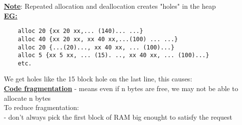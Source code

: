 \documentclass[12pt]{article}
\newcommand{\myt}[1]{\textbf{\underline{#1}}}
\begin{document}
	\myt{Note}: Repeated allocation and deallocation creates "holes" in the heap\\
	\myt{EG:}\\
	\begin{verbatim}
	alloc 20 {xx 20 xx,... (140)... ...}
	alloc 40 {xx 20 xx, xx 40 xx,...(100) ... ...}
	alloc 20 {...(20)..., xx 40 xx, ... (100)...}
	alloc 5 {xx 5 xx, ... (15). .., xx 40 xx, ... (100)...}
	etc.
	\end{verbatim}
	
	We get holes like the 15 block hole on the last line, this causes:\\
	\myt{Code fragmentation} - means even if n bytes are free, we may not be able to allocate n bytes\\
	
	To reduce fragmentation:\\
	- don't always pick the first block of RAM big enought to satisfy the request\\
	
	
	
\end{document}
